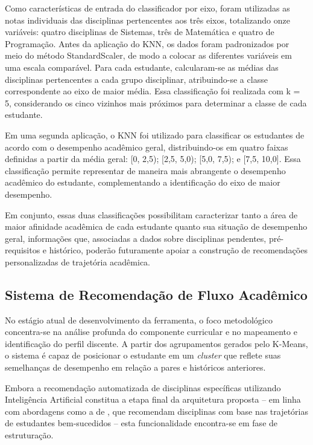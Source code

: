 Como características de entrada do classificador por eixo, foram utilizadas as notas individuais das disciplinas pertencentes aos três eixos, totalizando onze variáveis: quatro disciplinas de Sistemas, três de Matemática e quatro de Programação. Antes da aplicação do KNN, os dados foram padronizados por meio do método StandardScaler, de modo a colocar as diferentes variáveis em uma escala comparável. Para cada estudante, calcularam-se as médias das disciplinas pertencentes a cada grupo disciplinar, atribuindo-se a classe correspondente ao eixo de maior média. Essa classificação foi realizada com k = 5, considerando os cinco vizinhos mais próximos para determinar a classe de cada estudante.

Em uma segunda aplicação, o KNN foi utilizado para classificar os estudantes de acordo com o desempenho acadêmico geral, distribuindo-os em quatro faixas definidas a partir da m\'edia geral:
[0, 2{,}5); [2{,}5, 5{,}0); [5{,}0, 7{,}5); e [7{,}5, 10{,}0]. Essa classificação permite representar de maneira mais abrangente o desempenho acadêmico do estudante, complementando a identificação do eixo de maior desempenho.

Em conjunto, essas duas classificações possibilitam caracterizar tanto a área de maior afinidade acadêmica de cada estudante quanto sua situação de desempenho geral, informações que, associadas a dados sobre disciplinas pendentes, pré-requisitos e histórico, poderão futuramente apoiar a construção de recomendações personalizadas de trajetória acadêmica.

\subsection{Sistema de Recomendação de Fluxo Acadêmico}
No estágio atual de desenvolvimento da ferramenta, o foco metodológico concentra-se na análise profunda do componente curricular e no mapeamento e identificação do perfil discente. A partir dos agrupamentos gerados pelo K-Means, o sistema é capaz de posicionar o estudante em um \emph{cluster} que reflete suas semelhanças de desempenho em relação a pares e históricos anteriores. 

Embora a recomendação automatizada de disciplinas específicas utilizando Inteligência Artificial constitua a etapa final da arquitetura proposta -- em linha com
abordagens como a de \citet{wagner2024courserecommender}, que recomendam disciplinas
com base nas trajet\'orias de estudantes bem-sucedidos -- esta
funcionalidade encontra-se em fase de estrutura\c{c}\~ao.